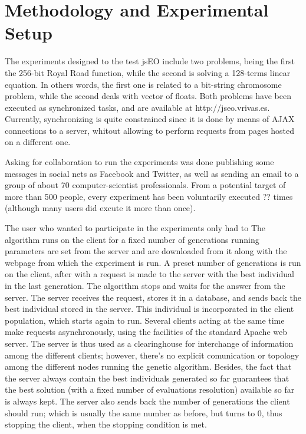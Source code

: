 \documentclass{llncs}
\begin{document}
\section{Methodology and Experimental Setup}
\label{sec:method}
The experiments designed to the test jsEO include two problems, being the first the 256-bit Royal Road function, while the second is solving a 128-terms linear equation. In others words, the first one is related to a bit-string chromosome problem, while the second deals with vector of floats. Both problems have been executed as synchronized tasks, and are available at http://jseo.vrivas.es. Currently, synchronizing is quite constrained since it is done by means of AJAX connections to a server, whitout allowing to perform requests from pages hosted on a different one. 

Asking for collaboration to run the experiments was done publishing some messages in social nets as Facebook and Twitter, as well as sending an email to a group of about 70 computer-scientist professionals. From a potential target of more than 500 people, every experiment has been voluntarily executed ?? times (although many users did excute it more than once).

The user who wanted to participate in the experiments only had to
The algorithm runs on the client for a fixed number of generations
 running parameters are set from the server and are downloaded from
it along with the webpage from which the experiment is run. A preset
number of generations is run on the client, after with a request is
made to the server with the best individual in the last
generation. The algorithm stops and waits for the answer from the
server. The server receives the request, stores it in a database, and
sends back the best individual stored in the server. This individual
is incorporated in the client population, which starts again to run. 
Several clients acting at the same time make requests asynchronously,
using the facilities of the standard Apache web server. The server is
thus used as a clearinghouse for interchange of information among the
different clients; however, there's no explicit comunication or
topology among the different nodes running the genetic
algorithm. Besides, the fact that the server always contain the best
individuals generated so far guarantees that the best solution (with a
fixed number of evaluations resolution) available so far is always
kept. The server also sends back the number of generations the
client should run; which is usually the same number as before, but
turns to 0, thus stopping the client, when the stopping condition is
met. 
\end{document}
